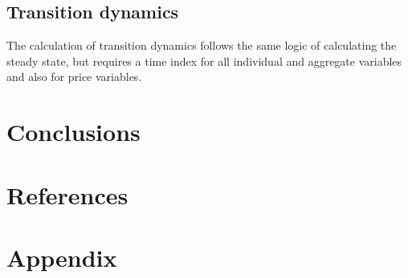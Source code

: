 \documentclass[12pt]{article}
\begin{document}
\subsection{Transition dynamics}
The calculation of transition dynamics follows the same logic of calculating the steady state, but requires a time index for all individual and aggregate variables and also for price variables.  

\section{Conclusions}

\section{References}

\section{Appendix}




\end{document}
